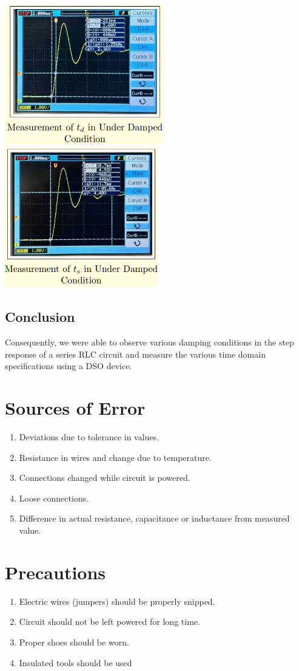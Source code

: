 \documentclass{article}
\begin{document}
    \\
    \includegraphics[width=0.52\textwidth]{i14.png}
    \includegraphics[width=0.5\textwidth]{i15.png}
\subsection{Conclusion}
Consequently, we were able to observe various damping conditions in the step response of a series RLC circuit and measure the various time domain specifications using a DSO device.
\newpage
\section{Sources of Error}
\begin{enumerate}
    \item Deviations due to tolerance in values.
    \item Resistance in wires and change due to temperature.
    \item Connections changed while circuit is powered.
    \item Loose connections.
    \item Difference in actual resistance, capacitance or inductance from measured value.
\end{enumerate}
\section{Precautions}
\begin{enumerate}
    \item Electric wires (jumpers) should be properly snipped.
    \item Circuit should not be left powered for long time.
    \item Proper shoes should be worn.
    \item Insulated tools should be used
\end{enumerate}
\end{document}
